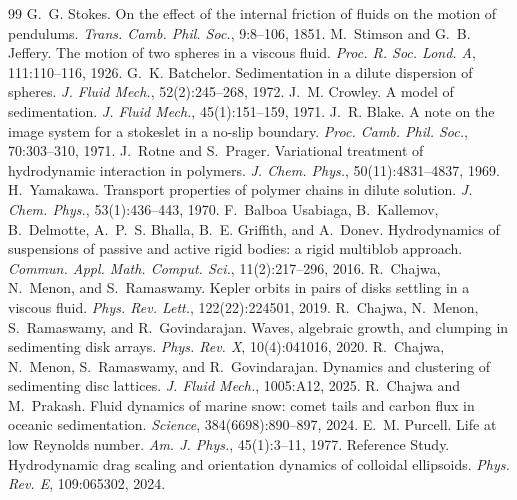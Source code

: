 \documentclass[11pt,a4paper]{article}
\begin{document}

\begin{thebibliography}{99}
 G.~G. Stokes. On the effect of the internal friction of fluids on the motion of pendulums. \emph{Trans. Camb. Phil. Soc.}, 9:8--106, 1851.
 M.~Stimson and G.~B. Jeffery. The motion of two spheres in a viscous fluid. \emph{Proc. R. Soc. Lond. A}, 111:110--116, 1926.
 G.~K. Batchelor. Sedimentation in a dilute dispersion of spheres. \emph{J. Fluid Mech.}, 52(2):245--268, 1972.
 J.~M. Crowley. A model of sedimentation. \emph{J. Fluid Mech.}, 45(1):151--159, 1971.
 J.~R. Blake. A note on the image system for a stokeslet in a no-slip boundary. \emph{Proc. Camb. Phil. Soc.}, 70:303--310, 1971.
 J.~Rotne and S.~Prager. Variational treatment of hydrodynamic interaction in polymers. \emph{J. Chem. Phys.}, 50(11):4831--4837, 1969.
 H.~Yamakawa. Transport properties of polymer chains in dilute solution. \emph{J. Chem. Phys.}, 53(1):436--443, 1970.
 F.~Balboa Usabiaga, B.~Kallemov, B.~Delmotte, A.~P.~S. Bhalla, B.~E. Griffith, and A.~Donev. Hydrodynamics of suspensions of passive and active rigid bodies: a rigid multiblob approach. \emph{Commun. Appl. Math. Comput. Sci.}, 11(2):217--296, 2016.
 R.~Chajwa, N.~Menon, and S.~Ramaswamy. Kepler orbits in pairs of disks settling in a viscous fluid. \emph{Phys. Rev. Lett.}, 122(22):224501, 2019.
 R.~Chajwa, N.~Menon, S.~Ramaswamy, and R.~Govindarajan. Waves, algebraic growth, and clumping in sedimenting disk arrays. \emph{Phys. Rev. X}, 10(4):041016, 2020.
 R.~Chajwa, N.~Menon, S.~Ramaswamy, and R.~Govindarajan. Dynamics and clustering of sedimenting disc lattices. \emph{J. Fluid Mech.}, 1005:A12, 2025.
 R.~Chajwa and M.~Prakash. Fluid dynamics of marine snow: comet tails and carbon flux in oceanic sedimentation. \emph{Science}, 384(6698):890--897, 2024.
 E.~M. Purcell. Life at low Reynolds number. \emph{Am. J. Phys.}, 45(1):3--11, 1977.
 Reference Study. Hydrodynamic drag scaling and orientation dynamics of colloidal ellipsoids. \emph{Phys. Rev. E}, 109:065302, 2024.
\end{thebibliography}
\end{document}
